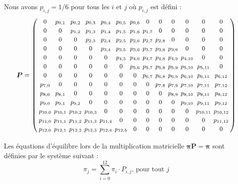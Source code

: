 \documentclass{article}
\begin{document}
    Nous avons \(p_{i,j} = 1/6\) pour tous les $i$ et $j$ où $p_{i,j}$ est défini :
    \[
        \boldsymbol{P} = \left(
        \begingroup
        \renewcommand{\arraystretch}{1.2}
        \setlength{\arraycolsep}{2pt}
        \small
        \begin{array}{*{13}{c}}
            0 & p_{0,1} & p_{0,2} & p_{0,3} & p_{0,4} & p_{0,5} & p_{0,6} & 0 & 0 & 0 & 0 & 0 & 0 \\
            0 & 0 & p_{1,2} & p_{1,3} & p_{1,4} & p_{1,5} & p_{1,6} & p_{1,7} & 0 & 0 & 0 & 0 & 0 \\
            0 & 0 & 0 & p_{2,3} & p_{2,4} & p_{2,5} & p_{2,6} & p_{2,7} & p_{2,8} & 0 & 0 & 0 & 0 \\
            0 & 0 & 0 & 0 & p_{3,4} & p_{3,5} & p_{3,6} & p_{3,7} & p_{3,8} & p_{3,9} & 0 & 0 & 0 \\
            0 & 0 & 0 & 0 & 0 & p_{4,5} & p_{4,6} & p_{4,7} & p_{4,8} & p_{4,9} & p_{4,10} & 0 & 0 \\
            0 & 0 & 0 & 0 & 0 & 0 & p_{5,6} & p_{5,7} & p_{5,8} & p_{5,9} & p_{5,10} & p_{5,11} & 0 \\
            0 & 0 & 0 & 0 & 0 & 0 & 0 & p_{6,7} & p_{6,8} & p_{6,9} & p_{6,10} & p_{6,11} & p_{6,12} \\
            p_{7,0} & 0 & 0 & 0 & 0 & 0 & 0 & 0 & p_{7,8} & p_{7,9} & p_{7,10} & p_{7,11} & p_{7,12} \\
            p_{8,0} & p_{8,1} & 0 & 0 & 0 & 0 & 0 & 0 & 0 & p_{8,9} & p_{8,10} & p_{8,11} & p_{8,12} \\
            p_{9,0} & p_{9,1} & p_{9,2} & 0 & 0 & 0 & 0 & 0 & 0 & 0 & p_{9,10} & p_{9,11} & p_{9,12} \\
            p_{10,0} & p_{10,1} & p_{10,2} & p_{10,3} & 0 & 0 & 0 & 0 & 0 & 0 & 0 & p_{10,11} & p_{10,12} \\
            p_{11,0} & p_{11,1} & p_{11,2} & p_{11,3} & p_{11,4} & 0 & 0 & 0 & 0 & 0 & 0 & 0 & p_{11,12} \\
            p_{12,0} & p_{12,1} & p_{12,2} & p_{12,3} & p_{12,4} & p_{12,5} & 0 & 0 & 0 & 0 & 0 & 0 & 0
        \end{array}
        \endgroup
        \right)
    \] 

    Les équations d'équilibre lors de la multiplication matricielle \(\boldsymbol{\pi}\boldsymbol{P} = \boldsymbol{\pi}\) sont définies par le système suivant :
    \[
        \pi_j = \sum^{12}_{i=0} \pi_i \cdot P_{i,j},\, \text{pour tout $j$}
    \]
    
\end{document}
